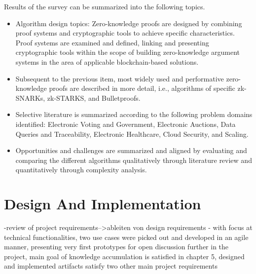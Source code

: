 Results of the survey can be summarized into the following topics. 
\begin{itemize}
    \item Algorithm design topics: Zero-knowledge proofs are designed by combining proof systems and cryptographic tools to achieve specific characteristics. Proof systems are examined and defined, linking and presenting cryptographic tools within the scope of building zero-knowledge argument systems in the area of applicable blockchain-based solutions.
    \item Subsequent to the previous item, most widely used and performative zero-knowledge proofs are described in more detail, i.e., algorithms of specific zk-SNARKs, zk-STARKS, and Bulletproofs.
    \item Selective literature is summarized according to the following problem domains identified: Electronic Voting and Government, Electronic Auctions, Data Queries and Traceability, Electronic Healthcare, Cloud Security, and Scaling.
    \item Opportunities and challenges are summarized and aligned by evaluating and comparing the different algorithms qualitatively through literature review and quantitatively through complexity analysis.
\end{itemize}

\section{Design And Implementation}
-review of project requirements-->ableiten von design requirements
- with focus at technical functionalities, two use cases were picked out and developed in an agile manner, presenting very first prototypes for open discussion further in the project, main goal of knowledge accumulation is satisfied in chapter 5, designed and implemented artifacts satisfy two other main project requirements
